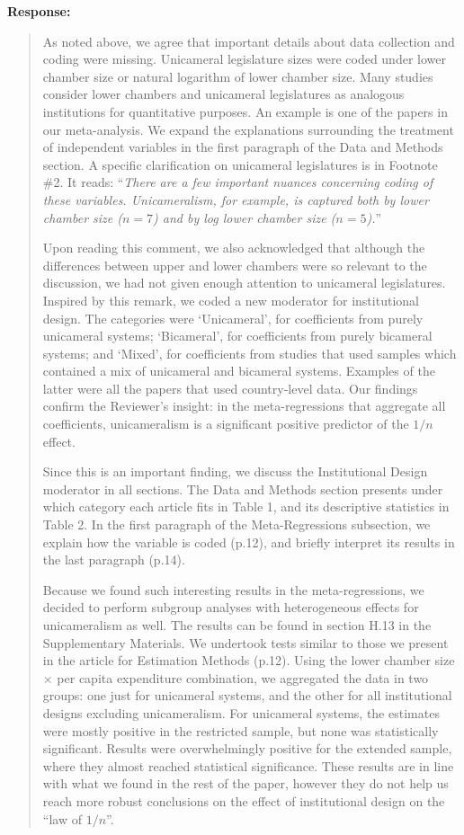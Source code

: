 \documentclass[a4paper,12pt]{article}
\begin{document}
\noindent \textbf{Response:} 
\begin{quote}
    As noted above, we agree that important details about data collection and coding were missing. Unicameral legislature sizes were coded under lower chamber size or natural logarithm of lower chamber size. Many studies consider lower chambers and unicameral legislatures as analogous institutions for quantitative purposes. An example is one of the papers in our meta-analysis. We expand the explanations surrounding the treatment of independent variables in the first paragraph of the Data and Methods section. A specific clarification on unicameral legislatures is in Footnote \#2. It reads: ``\textit{There are a few important nuances concerning coding of these variables. Unicameralism, for example, is captured both by lower chamber size ($n = 7$) and by log lower chamber size ($n = 5$).}''
    
    Upon reading this comment, we also acknowledged that although the differences between upper and lower chambers were so relevant to the discussion, we had not given enough attention to unicameral legislatures. Inspired by this remark, we coded a new moderator for institutional design. The categories were `Unicameral', for coefficients from purely unicameral systems; `Bicameral', for coefficients from purely bicameral systems; and `Mixed', for coefficients from studies that used samples which contained a mix of unicameral and bicameral systems. Examples of the latter were all the papers that used country-level data. Our findings confirm the Reviewer's insight: in the meta-regressions that aggregate all coefficients, unicameralism is a significant positive predictor of the $1/n$ effect. 
    
    Since this is an important finding, we discuss the Institutional Design moderator in all sections. The Data and Methods section presents under which category each article fits in Table 1, and its descriptive statistics in Table 2. In the first paragraph of the Meta-Regressions subsection, we explain how the variable is coded (p.12), and briefly interpret its results in the last paragraph (p.14).
    
    Because we found such interesting results in the meta-regressions, we decided to perform subgroup analyses with heterogeneous effects for unicameralism as well. The results can be found in section H.13 in the Supplementary Materials. We undertook tests similar to those we present in the article for Estimation Methods (p.12). Using the lower chamber size $\times$ per capita expenditure combination, we aggregated the data in two groups: one just for unicameral systems, and the other for all institutional designs excluding unicameralism. For unicameral systems, the estimates were mostly positive in the restricted sample, but none was statistically significant. Results were overwhelmingly positive for the extended sample, where they almost reached statistical significance. These results are in line with what we found in the rest of the paper, however they do not help us reach more robust conclusions on the effect of institutional design on the ``law of $1/n$''.
\end{quote}
\end{document}
